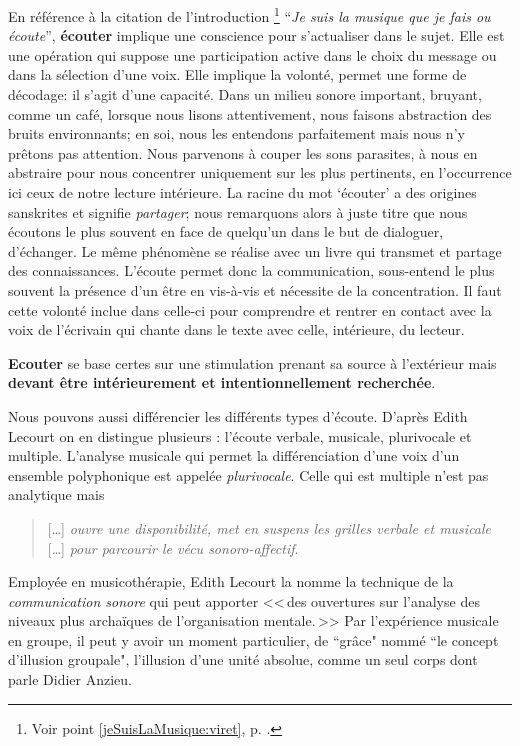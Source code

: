 En référence à la citation de l'introduction%
\footnote{Voir point \ref{jeSuisLaMusique:viret}, p. \pageref{jeSuisLaMusique:viret}.}
\enquote{\emph{Je suis la musique que je fais ou écoute}}\autocite{viret:b}, \textbf{écouter} implique 
une conscience pour s'actualiser dans le sujet. Elle est une opération 
qui suppose une participation active dans le choix du message
ou dans la sélection d'une voix. Elle  implique la volonté,
permet une forme de décodage: il s'agit d'une capacité.
Dans un milieu sonore important,
 bruyant, comme un café, lorsque nous lisons attentivement, nous faisons abstraction
des bruits environnants; en soi, nous les entendons parfaitement mais nous n'y
prêtons pas attention. Nous parvenons à couper les sons parasites, à nous en abstraire pour
nous concentrer uniquement sur les plus  pertinents, en l'occurrence ici ceux de notre lecture intérieure.
 La racine du mot `écouter' a des origines sanskrites et signifie \emph{partager}; nous remarquons alors à juste titre que nous écoutons le plus souvent en face de quelqu'un dans le but de dialoguer, d'échanger. Le même phénomène se réalise avec un livre qui transmet et partage des connaissances. L'écoute permet donc la communication, sous-entend le plus souvent la présence d'un être en vis-à-vis et nécessite de la  concentration. Il faut cette volonté inclue dans celle-ci  pour comprendre et rentrer en contact avec la voix de  l'écrivain qui chante dans le texte avec celle, intérieure, du lecteur.
 
 
 \textbf{Ecouter} se base certes sur une stimulation prenant sa source à 
l'extérieur mais \textbf{devant être intérieurement et  intentionnellement
	recherchée}.




Nous pouvons aussi différencier les différents types d'écoute. D'après Edith Lecourt \autocite[ch. 10 <<\,De l'écoute verbale à l'écoute musicale\,>>, p. 182.]{lecourt:decouvrir}
 on en distingue plusieurs : l'écoute verbale, musicale, plurivocale et multiple.
 L'analyse musicale qui permet la différenciation d'une voix d'un ensemble polyphonique est appelée \emph{plurivocale}. Celle qui est multiple n'est pas analytique  mais 
 \begin{quote}
 	 [\ldots] \textit{ouvre une disponibilité, met en suspens les grilles verbale et musicale} [\ldots] \emph{pour parcourir le vécu sonoro-affectif}\autocite[p. 183]{lecourt:decouvrir}.
 \end{quote}
 Employée en musicothérapie, Edith Lecourt la nomme la technique de la  \emph{communication sonore} qui peut apporter 
 <<\,des ouvertures sur l'analyse des niveaux plus archaïques de l'organisation mentale.\,>>\autocite[p. 154]{lecourt:decouvrir}	
 Par l'expérience musicale en groupe, il peut y avoir un moment particulier, de ``grâce"  nommé ``le concept d'illusion groupale", l'illusion d'une unité absolue, comme un seul corps\autocite{anzieu:groupal} dont parle Didier Anzieu.

